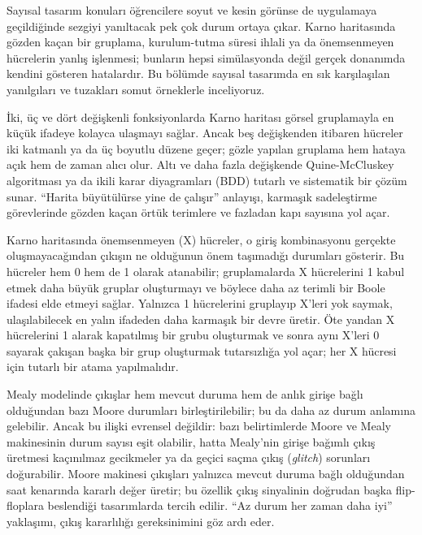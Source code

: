 Sayısal tasarım konuları öğrencilere soyut ve kesin görünse de uygulamaya geçildiğinde sezgiyi yanıltacak pek çok durum ortaya çıkar. Karno haritasında gözden kaçan bir gruplama, kurulum-tutma süresi ihlali ya da önemsenmeyen hücrelerin yanlış işlenmesi; bunların hepsi simülasyonda değil gerçek donanımda kendini gösteren hatalardır. Bu bölümde sayısal tasarımda en sık karşılaşılan yanılgıları ve tuzakları somut örneklerle inceliyoruz.

İki, üç ve dört değişkenli fonksiyonlarda Karno haritası görsel gruplamayla en küçük ifadeye kolayca ulaşmayı sağlar. Ancak beş değişkenden itibaren hücreler iki katmanlı ya da üç boyutlu düzene geçer; gözle yapılan gruplama hem hataya açık hem de zaman alıcı olur. Altı ve daha fazla değişkende Quine-McCluskey algoritması ya da ikili karar diyagramları (BDD) tutarlı ve sistematik bir çözüm sunar. ``Harita büyütülürse yine de çalışır'' anlayışı, karmaşık sadeleştirme görevlerinde gözden kaçan örtük terimlere ve fazladan kapı sayısına yol açar.

Karno haritasında önemsenmeyen (X) hücreler, o giriş kombinasyonu gerçekte oluşmayacağından çıkışın ne olduğunun önem taşımadığı durumları gösterir. Bu hücreler hem 0 hem de 1 olarak atanabilir; gruplamalarda X hücrelerini 1 kabul etmek daha büyük gruplar oluşturmayı ve böylece daha az terimli bir Boole ifadesi elde etmeyi sağlar. Yalnızca 1 hücrelerini gruplayıp X'leri yok saymak, ulaşılabilecek en yalın ifadeden daha karmaşık bir devre üretir. Öte yandan X hücrelerini 1 alarak kapatılmış bir grubu oluşturmak ve sonra aynı X'leri 0 sayarak çakışan başka bir grup oluşturmak tutarsızlığa yol açar; her X hücresi için tutarlı bir atama yapılmalıdır.

Mealy modelinde çıkışlar hem mevcut duruma hem de anlık girişe bağlı olduğundan bazı Moore durumları birleştirilebilir; bu da daha az durum anlamına gelebilir. Ancak bu ilişki evrensel değildir: bazı belirtimlerde Moore ve Mealy makinesinin durum sayısı eşit olabilir, hatta Mealy'nin girişe bağımlı çıkış üretmesi kaçınılmaz gecikmeler ya da geçici saçma çıkış (\emph{glitch}) sorunları doğurabilir. Moore makinesi çıkışları yalnızca mevcut duruma bağlı olduğundan saat kenarında kararlı değer üretir; bu özellik çıkış sinyalinin doğrudan başka flip-floplara beslendiği tasarımlarda tercih edilir. ``Az durum her zaman daha iyi'' yaklaşımı, çıkış kararlılığı gereksinimini göz ardı eder.


